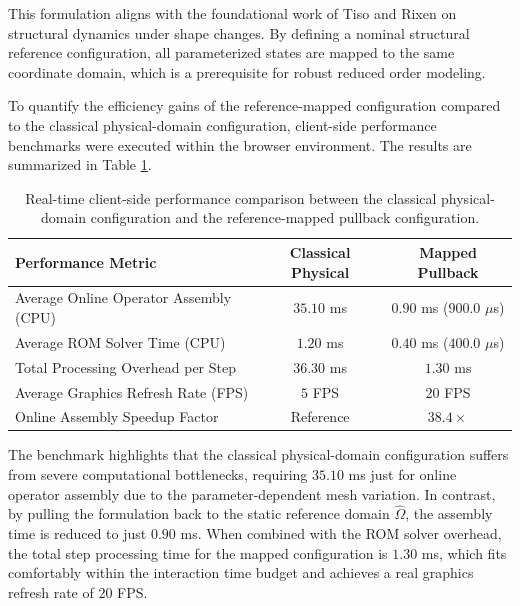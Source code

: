 This formulation aligns with the foundational work of Tiso and Rixen on structural dynamics under shape changes. By defining a nominal structural reference configuration, all parameterized states are mapped to the same coordinate domain, which is a prerequisite for robust reduced order modeling.

To quantify the efficiency gains of the reference-mapped configuration compared to the classical physical-domain configuration, client-side performance benchmarks were executed within the browser environment. The results are summarized in Table \ref{tab:performance_benchmarks}.

\begin{table}[htbp]
\centering
\caption{Real-time client-side performance comparison between the classical physical-domain configuration and the reference-mapped pullback configuration.}
\label{tab:performance_benchmarks}
\footnotesize
\setlength{\tabcolsep}{6pt}
\begin{tabular}{lcc}
\toprule
\textbf{Performance Metric} & \textbf{Classical Physical} & \textbf{Mapped Pullback} \\ \midrule
Average Online Operator Assembly (CPU) & $35.10$ ms & $0.90$ ms ($900.0$ $\mu$s) \\
Average ROM Solver Time (CPU)          & $1.20$ ms & $0.40$ ms ($400.0$ $\mu$s) \\
Total Processing Overhead per Step     & $36.30$ ms & $1.30$ ms \\
Average Graphics Refresh Rate (FPS)    & $5$ FPS & $20$ FPS \\
Online Assembly Speedup Factor         & Reference & $\mathbf{38.4\times}$ \\ \bottomrule
\end{tabular}
\end{table}

The benchmark highlights that the classical physical-domain configuration suffers from severe computational bottlenecks, requiring $35.10$ ms just for online operator assembly due to the parameter-dependent mesh variation. In contrast, by pulling the formulation back to the static reference domain $\hat{\Omega}$, the assembly time is reduced to just $0.90$ ms. When combined with the ROM solver overhead, the total step processing time for the mapped configuration is $1.30$ ms, which fits comfortably within the interaction time budget and achieves a real graphics refresh rate of 20 FPS.


